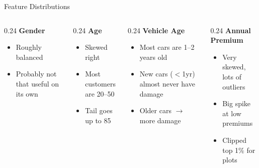 \documentclass[aspectratio=169, 10pt]{beamer}
\begin{document}
\begin{frame}{Feature Distributions}
  \begin{columns}[T]
    \begin{column}{0.24\textwidth}
      \textbf{Gender}
      \begin{itemize}\small
        \item Roughly balanced
        \item Probably not that useful on its own
      \end{itemize}
    \end{column}
    \begin{column}{0.24\textwidth}
      \textbf{Age}
      \begin{itemize}\small
        \item Skewed right
        \item Most customers are 20--50
        \item Tail goes up to 85
      \end{itemize}
    \end{column}
    \begin{column}{0.24\textwidth}
      \textbf{Vehicle Age}
      \begin{itemize}\small
        \item Most cars are 1--2 years old
        \item New cars ($<$1yr) almost never have damage
        \item Older cars $\to$ more damage
      \end{itemize}
    \end{column}
    \begin{column}{0.24\textwidth}
      \textbf{Annual Premium}
      \begin{itemize}\small
        \item Very skewed, lots of outliers
        \item Big spike at low premiums
        \item Clipped top 1\% for plots
      \end{itemize}
    \end{column}
  \end{columns}
\end{frame}
\end{document}
